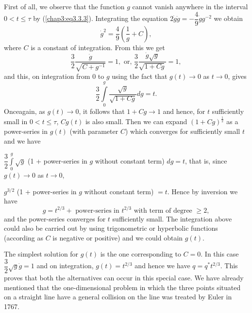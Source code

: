 First of all, we observe that the function $g$ cannot vanish anywhere
in the interval $0< t \leq \tau$ by (\ref{chap3:eq3.3.3}). Integrating
the equation $2 \dot{g} \ddot{g} = - \dfrac{4}{9} \dot{g} g^{-2}$ we
obtain 
$$
\dot{g}^2 = \frac{4}{9} \left(\frac{1}{g} + C \right), 
$$
where $C$ is a constant of integration. From this we get
$$
\frac{3}{2} \frac{\dot{g}}{\sqrt{C+ g^{-1}}}  = 1, \text{ or, }
\frac{3}{2} \frac{\dot{g} \sqrt{g}}{\sqrt{1+ Cg}} = 1,  
$$
and this, on integration from 0 to $g$ using the fact that $g(t) \to
0$ as $t \to 0$, gives 
$$
\frac{3}{2} \int\limits^g_0 \frac{\sqrt{g}}{\sqrt{1+ Cg}} dg = t.
$$
Once\pageoriginale again, as $g(t) \to 0$, it follows that $1+ Cg \to
1$ and hence, for $t$ sufficiently small in $0 < t \leq \tau$, $Cg(t)$
is also small. Then we can expand $(1+ Cg)^{\frac{1}{2}}$ as a
power-series in $g(t)$ (with parameter $C$) which converges for
sufficiently small $t$ and we have  

$\dfrac{3}{2} \int\limits^g_0 \sqrt{g}$ (1 + power-series in $g$
without constant term) $dg = t$, that is, since $g(t) \to 0$ as $t \to
0 $, 

$g^{3/2} $ (1 + power-series in $g$ without constant term) $ = t$.  
Hence by inversion we have
\begin{equation*}
g = t^{2/3} +  \text{  power-series in  } t^{2/3} \text{   with term
  of degree } \geq 2, \tag{3.3.4}\label{chap3:eq3.3.4} 
\end{equation*}
and the power-series converges for $t$ sufficiently small. The
integration above could also be carried out by using trigonometric or
hyperbolic functions (according as $C$ is negative or positive) and we
could obtain $g(t)$. 

The simplest solution for $g(t)$ is the one corresponding to $C=0$. In
this case $\dfrac{3}{2} \sqrt{g} \dot{g} =1$ and on integration, $g(t)
= t^{2/3}$ and hence we have $q = q^* t^{2/3}$. This proves that both
the alternatives can occur in this special case. We have already
mentioned that the one-dimensional problem in which the three points
situated on a straight line have a general collision on the line was
treated by Euler in 1767. 


